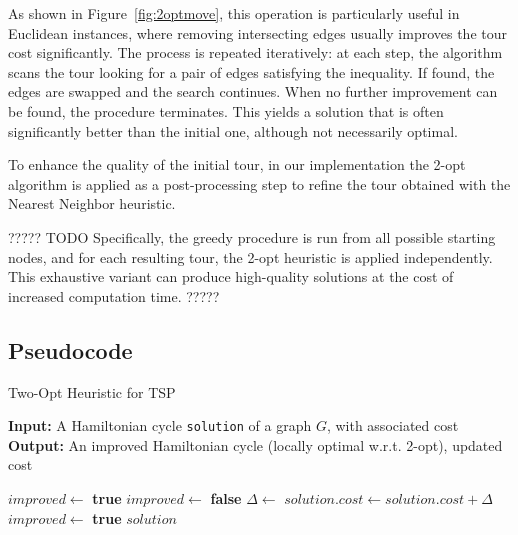 As shown in Figure~\ref{fig:2optmove}, this operation is particularly useful in Euclidean instances, where removing intersecting edges 
usually improves the tour cost significantly. The process is repeated iteratively: at each step, the algorithm scans the tour looking 
for a pair of edges satisfying the inequality. If found, the edges are swapped and the search continues. 
When no further improvement can be found, the procedure terminates. This yields a solution that is often significantly better than the initial one, 
although not necessarily optimal.

To enhance the quality of the initial tour, in our implementation the 2-opt algorithm is applied as a post-processing step to refine the tour obtained 
with the Nearest Neighbor heuristic. 

????? TODO
Specifically, the greedy procedure is run from all possible starting nodes, and for each resulting tour, 
the 2-opt heuristic is applied independently. This exhaustive variant can produce high-quality solutions at the cost of increased computation time. 
?????

\subsection{Pseudocode}

\begin{algorithm}
\caption{Two-Opt Heuristic for TSP}
\label{alg:twoopt}
\textbf{Input:} A Hamiltonian cycle \texttt{solution} of a graph $G$, with associated cost\\
\textbf{Output:} An improved Hamiltonian cycle (locally optimal w.r.t. 2-opt), updated cost
\begin{algorithmic}
    \State $improved \gets$ \textbf{true}
        \State $improved \gets$ \textbf{false}
                \State $\Delta \gets$ 
                    \State {}
                    \State $solution.cost \gets solution.cost + \Delta$
                    \State $improved \gets$ \textbf{true}
                \EndIf
            \EndFor
        \EndFor
    \EndWhile
    \State \Return $solution$
\EndProcedure
\end{algorithmic}
\end{algorithm}

